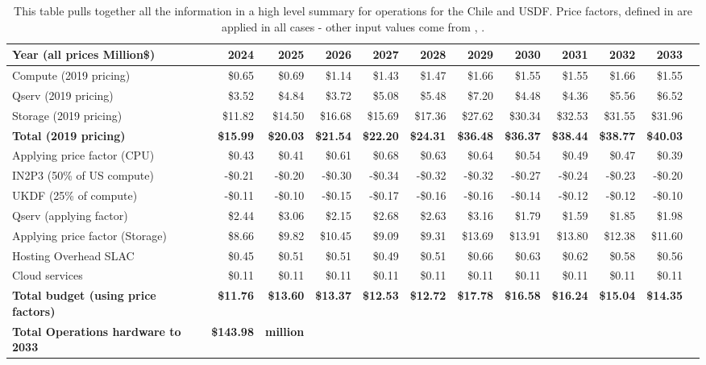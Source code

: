 \tiny \begin{longtable} { |p{}  |r  |r  |r  |r  |r  |r  |r  |r  |r  |r  |r |} 
\caption{This table pulls together all the information in a high level summary for operations  for the Chile and USDF. Price factors, defined in  are applied in all cases - other input values come from , .
 \label{tab:opsSummary}}\\ 
\hline 
\textbf{Year  (all prices Million\$)}&\textbf{2024}&\textbf{2025}&\textbf{2026}&\textbf{2027}&\textbf{2028}&\textbf{2029}&\textbf{2030}&\textbf{2031}&\textbf{2032}&\textbf{2033} \\ \hline
{Compute (2019 pricing)}&{\$0.65}&{\$0.69}&{\$1.14}&{\$1.43}&{\$1.47}&{\$1.66}&{\$1.55}&{\$1.55}&{\$1.66}&{\$1.55} \\ \hline
{Qserv (2019 pricing)}&{\$3.52}&{\$4.84}&{\$3.72}&{\$5.08}&{\$5.48}&{\$7.20}&{\$4.48}&{\$4.36}&{\$5.56}&{\$6.52} \\ \hline
{Storage (2019 pricing)}&{\$11.82}&{\$14.50}&{\$16.68}&{\$15.69}&{\$17.36}&{\$27.62}&{\$30.34}&{\$32.53}&{\$31.55}&{\$31.96} \\ \hline
\textbf{Total (2019 pricing)}&\textbf{\$15.99}&\textbf{\$20.03}&\textbf{\$21.54}&\textbf{\$22.20}&\textbf{\$24.31}&\textbf{\$36.48}&\textbf{\$36.37}&\textbf{\$38.44}&\textbf{\$38.77}&\textbf{\$40.03} \\ \hline
{Applying price factor (CPU)}&{\$0.43}&{\$0.41}&{\$0.61}&{\$0.68}&{\$0.63}&{\$0.64}&{\$0.54}&{\$0.49}&{\$0.47}&{\$0.39} \\ \hline
{IN2P3 (50\% of US compute)}&{-\$0.21}&{-\$0.20}&{-\$0.30}&{-\$0.34}&{-\$0.32}&{-\$0.32}&{-\$0.27}&{-\$0.24}&{-\$0.23}&{-\$0.20} \\ \hline
{UKDF (25\% of compute)}&{-\$0.11}&{-\$0.10}&{-\$0.15}&{-\$0.17}&{-\$0.16}&{-\$0.16}&{-\$0.14}&{-\$0.12}&{-\$0.12}&{-\$0.10} \\ \hline
{Qserv (applying factor)}&{\$2.44}&{\$3.06}&{\$2.15}&{\$2.68}&{\$2.63}&{\$3.16}&{\$1.79}&{\$1.59}&{\$1.85}&{\$1.98} \\ \hline
{Applying price factor (Storage)}&{\$8.66}&{\$9.82}&{\$10.45}&{\$9.09}&{\$9.31}&{\$13.69}&{\$13.91}&{\$13.80}&{\$12.38}&{\$11.60} \\ \hline
{Hosting Overhead SLAC}&{\$0.45}&{\$0.51}&{\$0.51}&{\$0.49}&{\$0.51}&{\$0.66}&{\$0.63}&{\$0.62}&{\$0.58}&{\$0.56} \\ \hline
{Cloud services}&{\$0.11}&{\$0.11}&{\$0.11}&{\$0.11}&{\$0.11}&{\$0.11}&{\$0.11}&{\$0.11}&{\$0.11}&{\$0.11} \\ \hline
\textbf{Total budget (using price factors)}&\textbf{\$11.76}&\textbf{\$13.60}&\textbf{\$13.37}&\textbf{\$12.53}&\textbf{\$12.72}&\textbf{\$17.78}&\textbf{\$16.58}&\textbf{\$16.24}&\textbf{\$15.04}&\textbf{\$14.35} \\ \hline
\textbf{Total Operations hardware to 2033}&\textbf{\$143.98}&\textbf{million}&&&&&&&& \\ \hline
\end{longtable} \normalsize

